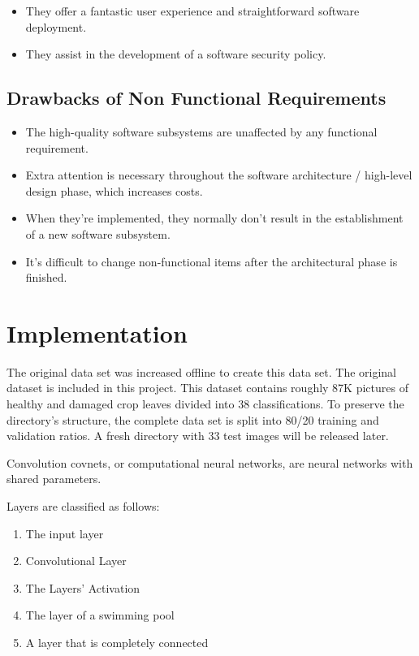 \begin{itemize}
\item They offer a fantastic user experience and straightforward software deployment.
\item They assist in the development of a software security policy. 
\end{itemize}

\subsection{Drawbacks of Non Functional Requirements}
\begin{itemize}
\item The high-quality software subsystems are unaffected by any functional requirement.
\item Extra attention is necessary throughout the software architecture / high-level design phase, which increases costs.
\item When they're implemented, they normally don't result in the establishment of a new software subsystem.
\item It's difficult to change non-functional items after the architectural phase is finished.
\end{itemize}

\section{Implementation}

The original data set was increased offline to create this data set. The original dataset is included in this project. This dataset contains roughly 87K pictures of healthy and damaged crop leaves divided into 38 classifications. To preserve the directory's structure, the complete data set is split into 80/20 training and validation ratios. A fresh directory with 33 test images will be released later.

Convolution covnets, or computational neural networks, are neural networks with shared parameters.

Layers are classified as follows:

\begin{enumerate}
\item The input layer
\item Convolutional Layer
\item The Layers' Activation
\item The layer of a swimming pool
\item A layer that is completely connected
\end{enumerate}


